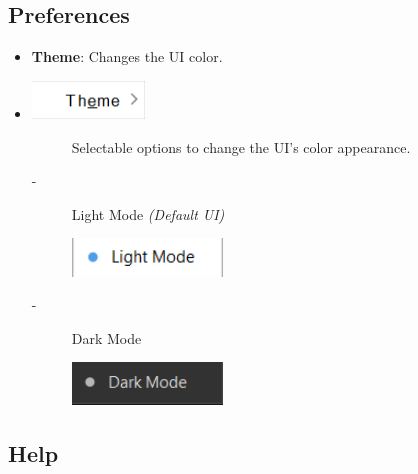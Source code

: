 \documentclass{article}
\begin{document}
\subsection{Preferences}

\begin{itemize}
    \item \textbf{Theme}: Changes the UI color.
    \item[] \includegraphics[width=3cm]{Images/Preferences_Theme.png}
    \begin{description}
        \item[] Selectable options to change the UI's color appearance.
            \item[-] Light Mode \textit{(Default UI)}
            \item[] \includegraphics[width=4cm]{Images/Selected_LightMode.png}
            \item[-] Dark Mode
            \item[] \includegraphics[width=4cm]{Images/Selected_DarkMode.png}
    \end{description}
\end{itemize}

\clearpage

\subsection{Help}
\end{document}
